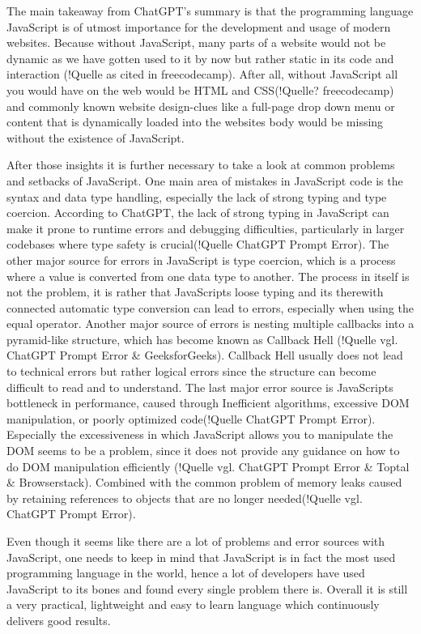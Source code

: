 The main takeaway from ChatGPT's summary is that the programming language JavaScript is of utmost importance for the development and usage of modern websites. Because without JavaScript, many parts of a website would not be dynamic as we have gotten used to it by now but rather static in its code and interaction (!Quelle as cited in freecodecamp). After all, without JavaScript \dq all you would have on the web would be HTML and CSS\dq (!Quelle? freecodecamp) and commonly known website design-clues like a full-page drop down menu or content that is dynamically loaded into the websites body would be missing without the existence of JavaScript.

After those insights it is further necessary to take a look at common problems and setbacks of JavaScript. One main area of mistakes in JavaScript code is the syntax and data type handling, especially the lack of strong typing and type coercion. According to ChatGPT, the lack of strong typing in JavaScript \dq can make it prone to runtime errors and debugging difficulties, particularly in larger codebases where type safety is crucial\dq (!Quelle ChatGPT Prompt Error). The other major source for errors in JavaScript is type coercion, which is a process where a value is converted from one data type to another. The process in itself is not the problem, it is rather that JavaScripts loose typing and its therewith connected automatic type conversion can lead to errors, especially when using the equal operator.
Another major source of errors is nesting multiple callbacks into a pyramid-like structure, which has become known as Callback Hell (!Quelle vgl. ChatGPT Prompt Error \& GeeksforGeeks). Callback Hell usually does not lead to technical errors but rather logical errors since the structure can become difficult to read and to understand. 
The last major error source is JavaScripts bottleneck in performance, caused through \dq Inefficient algorithms, excessive DOM manipulation, or poorly optimized code\dq (!Quelle ChatGPT Prompt Error). Especially the excessiveness in which JavaScript allows you to manipulate the DOM seems to be a problem, since it does not provide any guidance on how to do DOM manipulation efficiently (!Quelle vgl. ChatGPT Prompt Error \& Toptal \& Browserstack). Combined with the common problem of memory leaks caused by \dq retaining references to objects that are no longer needed\dq (!Quelle vgl. ChatGPT Prompt Error).

Even though it seems like there are a lot of problems and error sources with JavaScript, one needs to keep in mind that JavaScript is in fact the most used programming language in the world, hence a lot of developers have used JavaScript to its bones and found every single problem there is. Overall it is still a very practical, lightweight and easy to learn language which continuously delivers good results.